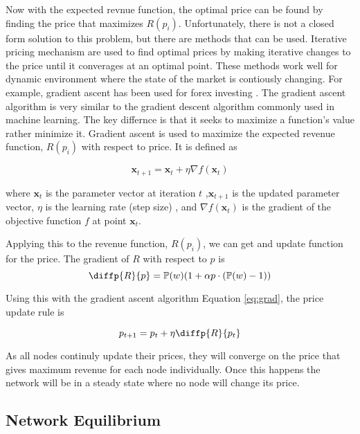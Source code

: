 \documentclass[preprint,twoside,11pt]{article}
\begin{document}
Now with the expected revnue function, the optimal price can be found by finding the price that maximizes $R(p_i)$.
Unfortunately, there is not a closed form solution to this problem, but there are methods that can be used.
Iterative pricing mechanism \citep{ecf80b8b-07bb-374f-ab3f-2cc6a349f689} are used to find optimal prices by making iterative changes to the price until it converages at an optimal point.
These methods work well for dynamic environment where the state of the market is contiously changing.
For example, gradient ascent has been used for forex investing \citep{su142215328}.
The gradient ascent algorithm is very similar to the gradient descent \citep{cauchy1847methode} algorithm commonly used in machine learning.
The key differnce is that it seeks to maximize a function's value rather minimize it.
Gradient ascent is used to maximize the expected revenue function, $R(p_i)$ with respect to price.
It is defined as

\begin{equation}
	\mathbf{x}_{t+1} = \mathbf{x}_t + \eta \nabla f(\mathbf{x}_t)
	\label{eq:grad}
\end{equation}

where $\mathbf{x}_t$ is the parameter vector at iteration $t$
,$\mathbf{x}_{t+1}$ is the updated parameter vector,
$\eta$ is the learning rate (step size)
, and $\nabla f(\mathbf{x}_t)$ is the gradient of the objective function $f$ at point $\mathbf{x}_t$.

Applying this to the revenue function, $R(p_i)$, we can get and update function for the price.
The gradient of $R$ with respect to $p$ is
$$\diffp{R}{p} = \mathbb{P}(w)(1 + \alpha p \cdot (\mathbb{P}(w) - 1))$$

Using this with the gradient ascent algorithm Equation \ref{eq:grad}, the price update rule is

\begin{equation}
	p_{t+1} = p_t + \eta \diffp{R}{{p_t}}
	\label{eq:optim_price}
\end{equation}

As all nodes continuly update their prices, they will converge on the price that gives
maximum revenue for each node individually. Once this happens the network will be in a steady state where
no node will change its price.

\subsection{Network Equilibrium}
\end{document}
